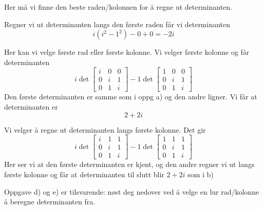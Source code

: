 \begin{losning}
	Her må vi finne den beste raden/kolonnen for å regne ut determinanten.
	\begin{punkt}	%
		Regner vi ut determinanten langs den første raden får vi determinanten
		\begin{equation*}
			i(i^2 - 1^2)  - 0 + 0 = -2i
		\end{equation*}
	\end{punkt}
	\begin{punkt}	%
		Her kan vi velge første rad eller første kolonne. Vi velger første kolonne og får determinanten
		\begin{equation*}
			i\det 
			\begin{bmatrix}
				i & 0 & 0 \\
				0 & i & 1 \\
				0 & 1 & i
			\end{bmatrix}
			-1\det
			\begin{bmatrix}
				1 & 0 & 0 \\
				0 & i & 1 \\
				0 & 1 & i
			\end{bmatrix}
		\end{equation*}
		Den første determinanten er samme som i oppg a) og den andre ligner. Vi får at determinanten er
		\begin{equation*}
			2 + 2i
		\end{equation*}
	\end{punkt}

	\begin{punkt}
		Vi velger å regne ut determinanten langs første kolonne. Det gir
		\begin{equation*}
			i\det\begin{bmatrix}
				i & 1 & 1 \\
				0 & i & 1 \\
				0 & 1 & i
			\end{bmatrix}
			-1\det\begin{bmatrix}
				1 & 1 & 1 \\
				0 & i & 1 \\
				0 & 1 & i
			\end{bmatrix}
		\end{equation*}
		Her ser vi at den første determinanten er kjent, og den andre regner vi ut langs første kolonne og får at determinanten til slutt blir $2 + 2i$ som i b)
	\end{punkt}
	Oppgave d) og e) er tilsvarende: nøst deg nedover ved å velge en lur rad/kolonne å beregne determinanten fra.
\end{losning}

